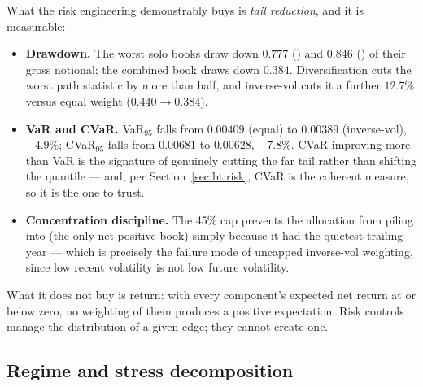 What the risk engineering demonstrably buys is \emph{tail reduction}, and it is measurable:
\begin{itemize}
  \item \textbf{Drawdown.} The worst solo books draw down $0.777$ () and
    $0.846$ () of their gross notional; the combined book draws down $0.384$.
    Diversification cuts the worst path statistic by more than half, and inverse-vol cuts
    it a further $12.7\%$ versus equal weight ($0.440\to0.384$).
  \item \textbf{VaR and CVaR.} VaR$_{95}$ falls from $0.00409$ (equal) to $0.00389$
    (inverse-vol), $-4.9\%$; CVaR$_{95}$ falls from $0.00681$ to $0.00628$, $-7.8\%$.
    CVaR improving more than VaR is the signature of genuinely cutting the far tail rather
    than shifting the quantile --- and, per Section~\ref{sec:bt:risk}, CVaR is the coherent
    measure, so it is the one to trust.
  \item \textbf{Concentration discipline.} The 45\% cap prevents the allocation from
    piling into  (the only net-positive book) simply because it had the quietest
    trailing year --- which is precisely the failure mode of uncapped inverse-vol
    weighting, since low recent volatility is not low future volatility.
\end{itemize}
What it does not buy is return: with every component's expected net return at or below
zero, no weighting of them produces a positive expectation. Risk controls manage the
distribution of a given edge; they cannot create one.

\subsection{Regime and stress decomposition}

